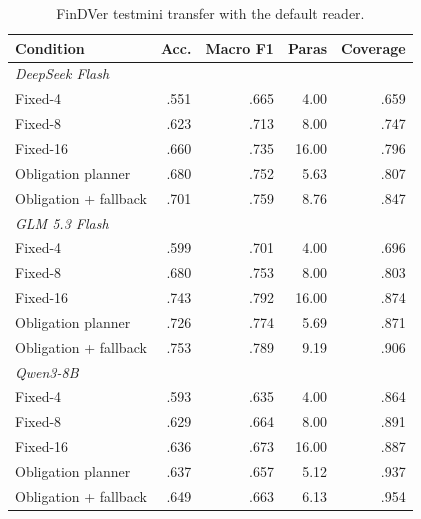 \begin{table}[t]
\centering
\scriptsize
\setlength{\tabcolsep}{4pt}
\caption{FinDVer testmini transfer with the default reader.}
\label{tab:findver}
\begin{tabular}{lrrrr}
\toprule
Condition & Acc. & Macro F1 & Paras & Coverage \\
\midrule
\multicolumn{5}{l}{\textit{DeepSeek Flash}} \\
Fixed-4 & .551 & .665 & 4.00 & .659 \\
Fixed-8 & .623 & .713 & 8.00 & .747 \\
Fixed-16 & .660 & .735 & 16.00 & .796 \\
Obligation planner & .680 & .752 & 5.63 & .807 \\
Obligation + fallback & .701 & .759 & 8.76 & .847 \\
\midrule
\multicolumn{5}{l}{\textit{GLM 5.3 Flash}} \\
Fixed-4 & .599 & .701 & 4.00 & .696 \\
Fixed-8 & .680 & .753 & 8.00 & .803 \\
Fixed-16 & .743 & .792 & 16.00 & .874 \\
Obligation planner & .726 & .774 & 5.69 & .871 \\
Obligation + fallback & .753 & .789 & 9.19 & .906 \\
\midrule
\multicolumn{5}{l}{\textit{Qwen3-8B}} \\
Fixed-4 & .593 & .635 & 4.00 & .864 \\
Fixed-8 & .629 & .664 & 8.00 & .891 \\
Fixed-16 & .636 & .673 & 16.00 & .887 \\
Obligation planner & .637 & .657 & 5.12 & .937 \\
Obligation + fallback & .649 & .663 & 6.13 & .954 \\
\bottomrule
\end{tabular}
\end{table}
